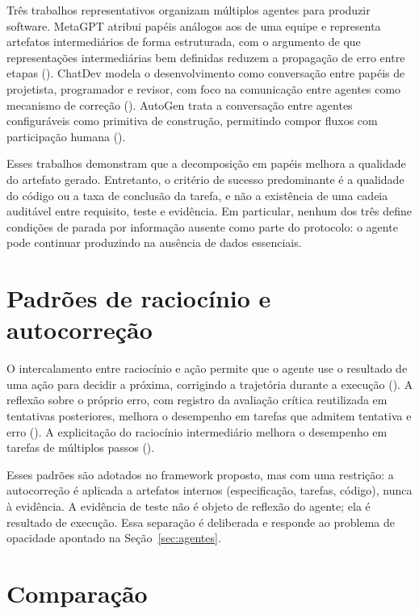 Três trabalhos representativos organizam múltiplos agentes para produzir software.
MetaGPT atribui papéis análogos aos de uma equipe e representa artefatos
intermediários de forma estruturada, com o argumento de que representações
intermediárias bem definidas reduzem a propagação de erro entre etapas
(). ChatDev modela o desenvolvimento como
conversação entre papéis de projetista, programador e revisor, com foco na
comunicação entre agentes como mecanismo de correção
(). AutoGen trata a conversação entre agentes
configuráveis como primitiva de construção, permitindo compor fluxos com
participação humana ().

Esses trabalhos demonstram que a decomposição em papéis melhora a qualidade do
artefato gerado. Entretanto, o critério de sucesso predominante é a qualidade do
código ou a taxa de conclusão da tarefa, e não a existência de uma cadeia
auditável entre requisito, teste e evidência. Em particular, nenhum dos três
define condições de parada por informação ausente como parte do protocolo: o
agente pode continuar produzindo na ausência de dados essenciais.

\section{Padrões de raciocínio e autocorreção}
\label{sec:rel-padroes}

O intercalamento entre raciocínio e ação permite que o agente use o resultado de
uma ação para decidir a próxima, corrigindo a trajetória durante a execução
(). A reflexão sobre o próprio erro, com registro da
avaliação crítica reutilizada em tentativas posteriores, melhora o desempenho em
tarefas que admitem tentativa e erro (). A
explicitação do raciocínio intermediário melhora o desempenho em tarefas de
múltiplos passos ().

Esses padrões são adotados no framework proposto, mas com uma restrição: a
autocorreção é aplicada a artefatos internos (especificação, tarefas, código),
nunca à evidência. A evidência de teste não é objeto de reflexão do agente; ela é
resultado de execução. Essa separação é deliberada e responde ao problema de
opacidade apontado na Seção~\ref{sec:agentes}.

\section{Comparação}
\label{sec:rel-comparacao}

